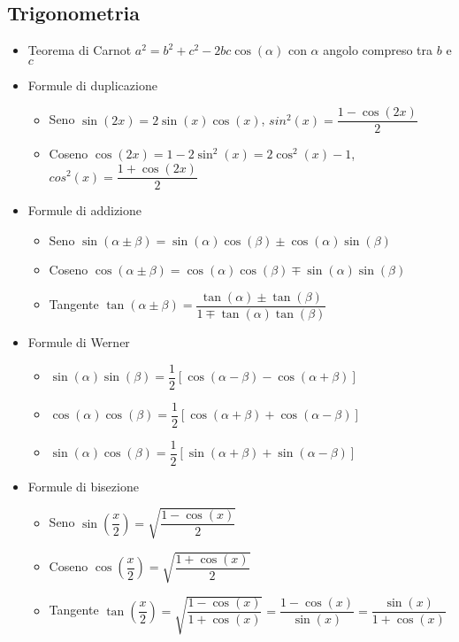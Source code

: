\documentclass{article}
\begin{document}
\subsection{Trigonometria}
\begin{itemize}
	\item Teorema di Carnot \( a^2 = b^2 + c^2 - 2bc\cos(\alpha)\) con \(\alpha\) angolo compreso tra \(b\) e \(c\) 
	\item Formule di duplicazione
	\begin{itemize}
		\item Seno \(\sin(2x) = 2 \sin(x) \cos(x) \), \(sin^2(x) = \dfrac{1 - \cos(2x)}{2} \)
		\item Coseno \( \cos(2x) = 1 - 2 \sin^2(x) = 2 \cos^2(x) - 1\), \(cos^2(x) = \dfrac{1 + \cos(2x)}{2} \)
	\end{itemize}
	\item Formule di addizione
	\begin{itemize}
		\item Seno \( \sin(\alpha \pm \beta ) = \sin(\alpha)\cos(\beta) \pm \cos(\alpha)\sin(\beta)\)
		\item Coseno \( \cos(\alpha \pm \beta ) = \cos(\alpha)\cos(\beta) \mp \sin(\alpha)\sin(\beta)\)
		\item Tangente \(\tan(\alpha \pm \beta ) = \dfrac{\tan(\alpha) \pm \tan(\beta)}{1 \mp \tan(\alpha) \tan(\beta)} \)
	\end{itemize}
	\item Formule di Werner
	\begin{itemize}
		\item \( \sin(\alpha) \sin(\beta) = \dfrac{1}{2} \left[ \cos(\alpha - \beta) - \cos(\alpha + \beta) \right] \)
		\item \( \cos(\alpha) \cos(\beta) = \dfrac{1}{2} \left[ \cos(\alpha + \beta) + \cos(\alpha - \beta) \right] \)
		\item \( \sin(\alpha) \cos(\beta) = \dfrac{1}{2} \left[ \sin(\alpha + \beta) + \sin(\alpha - \beta) \right] \)
	\end{itemize}
	\item Formule di bisezione
	\begin{itemize}
		\item Seno \( \sin\left( \dfrac{x}{2} \right) = \sqrt{\dfrac{1 - \cos(x)}{2}} \)
		\item Coseno  \( \cos\left( \dfrac{x}{2} \right) = \sqrt{\dfrac{1 + \cos(x)}{2}} \)
		\item Tangente \( \tan\left( \dfrac{x}{2} \right) = \sqrt{\dfrac{1 - \cos(x)}{1 + \cos(x)}} = \dfrac{1 - \cos(x)}{\sin(x)} = \dfrac{\sin(x)}{1 + \cos(x)} \)

\end{itemize}
\end{itemize}
\end{document}
